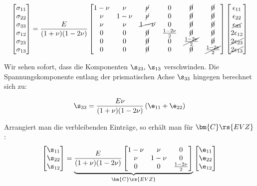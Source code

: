\begin{equation}
\label{evz1}
\begin{bmatrix} 
\sigma_{11} \\
\sigma_{22} \\
\sigma_{33} \\
\sigma_{12} \\
\sigma_{23} \\
\sigma_{13} 
\end{bmatrix} = \frac{E}{(1+\nu)(1-2\nu)}\begin{bmatrix}
1-\nu & \nu & \cancel{\nu} & 0 & \cancel{0} & \cancel{0} \\
\nu & 1-\nu & \cancel{\nu} & 0 & \cancel{0} & \cancel{0} \\
\nu & \nu & \cancel{1-\nu} & 0 & \cancel{0} & \cancel{0} \\
0 & 0 & \cancel{0} & \frac{1-2\nu}{2} & \cancel{0} & \cancel{0} \\
0 & 0 & \cancel{0} & 0 & \cancel{\frac{1-2\nu}{2}} & \cancel{0} \\
0 & 0 & \cancel{0} & 0 & \cancel{0} & \cancel{\frac{1-2\nu}{2}} \\ 
\end{bmatrix} \begin{bmatrix} \epsilon_{11} \\ \epsilon_{22} \\ \cancel{\epsilon_{33}} \\ 2\epsilon_{12} \\ \cancel{2\epsilon_{23}} \\ \cancel{2\epsilon_{13}} \end{bmatrix}
\end{equation}

Wir sehen sofort, dass die Komponenten $\s_{23},\, \s_{13}$ verschwinden. Die Spannungskomponente entlang der prismatischen Achse $\s_{33}$ hingegen berechnet sich zu:

\begin{equation}
\s_{33} = \frac{E \nu}{(1+\nu)(1-2\nu)} \left(\e_{11} + \e_{22} \right)
\end{equation}


Arrangiert man die verbleibenden Einträge, so erhält man für $\bm{C}\rs{EVZ}$:
\begin{equation}
\label{evz2}
 \begin{bmatrix} 
\s_{11} \\
\s_{22} \\
\s_{12} 
\end{bmatrix}= \underbrace{\frac{E }{(1+\nu)(1-2\nu)} \begin{bmatrix}
1-\nu & \nu & 0 \\
\nu & 1-\nu & 0 \\
0 & 0 & \frac{1-2\nu}{2}
\end{bmatrix}}_{\bm{C}\rs{EVZ}}  \begin{bmatrix} 
\e_{11} \\
\e_{22} \\
\e_{12} 
\end{bmatrix}
\end{equation}

